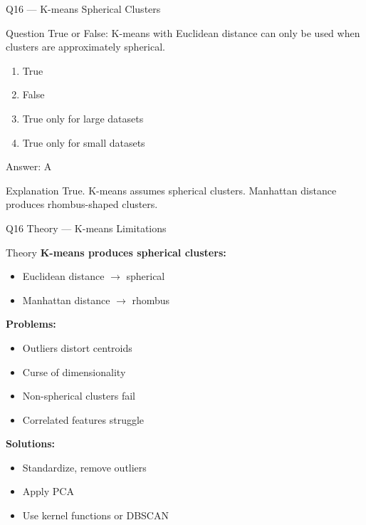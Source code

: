 \documentclass[aspectratio=169,8pt]{beamer}
\begin{document}
	\begin{frame}{Q16 --- K-means Spherical Clusters}
		\begin{block}{Question}
			True or False: K-means with Euclidean distance can only be used when clusters are approximately spherical.
		\end{block}
		\begin{enumerate}[label=\Alph*.]
			\item True
			\item False
			\item True only for large datasets
			\item True only for small datasets
		\end{enumerate}
		\begin{exampleblock}{Answer: A}
		\end{exampleblock}
		\begin{block}{Explanation}
			True. K-means assumes spherical clusters. Manhattan distance produces rhombus-shaped clusters.
		\end{block}
	\end{frame}
	
	\begin{frame}{Q16 Theory --- K-means Limitations}
		\begin{block}{Theory}
			\textbf{K-means produces spherical clusters:}
			\begin{itemize}
				\item Euclidean distance $\rightarrow$ spherical
				\item Manhattan distance $\rightarrow$ rhombus
			\end{itemize}
			\textbf{Problems:}
			\begin{itemize}
				\item Outliers distort centroids
				\item Curse of dimensionality
				\item Non-spherical clusters fail
				\item Correlated features struggle
			\end{itemize}
			\textbf{Solutions:}
			\begin{itemize}
				\item Standardize, remove outliers
				\item Apply PCA
				\item Use kernel functions or DBSCAN
			\end{itemize}
		\end{block}
	\end{frame}
	
\end{document}

